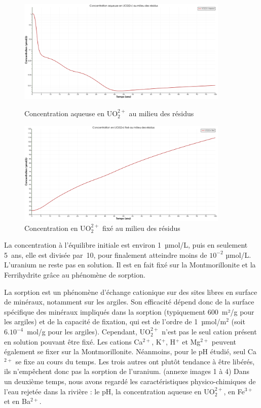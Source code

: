 \documentclass{article}
\begin{document}
\begin{figure}[H]
    \centering
    \begin{minipage}{0.5\textwidth}
        \centering
        \includegraphics[width=0.9\textwidth]{III_B_2_3.png} 
        \caption{Concentration aqueuse en UO$_2^{2+}$ au milieu des résidus}
        \label{fig:UO2_residus_sable_base}
    \end{minipage}\hfill
    \begin{minipage}{0.5\textwidth}
        \centering
        \includegraphics[width=0.9\textwidth]{III_B_2_4.png} 
        \caption{Concentration en UO$_2^{2+}$ fixé au milieu des résidus}
        \label{fig:UO2_fixe_residus_sable_base}
    \end{minipage}
\end{figure}

La concentration à l’équilibre initiale est environ 1~µmol/L, puis en seulement 5~ans, elle est divisée par~10, pour finalement atteindre moins de $10^{-2}$ µmol/L. L’uranium ne reste pas en solution. Il est en fait fixé sur la Montmorillonite et la Ferrihydrite grâce au phénomène de sorption.

La sorption est un phénomène d’échange cationique sur des sites libres en surface de minéraux, notamment sur les argiles. Son efficacité dépend donc de la surface spécifique des minéraux impliqués dans la sorption (typiquement 600~m²/g pour les argiles) et de la capacité de fixation, qui est de l’ordre de 1~µmol/m$^2$ (soit $6 . 10^{-4}$~mol/g pour les argiles). Cependant, UO$_2^{2+}$ n’est pas le seul cation présent en solution pouvant être fixé. Les cations Ca$^{2+}$, K$^{+}$, H$^{+}$ et Mg$^{2+}$ peuvent également se fixer sur la Montmorillonite. Néanmoins, pour le pH étudié, seul Ca$^{2+}$ se fixe au cours du temps. Les trois autres ont plutôt tendance à être libérés, ils n’empêchent donc pas la sorption de l’uranium. (annexe images 1 à 4)
Dans un deuxième temps, nous avons regardé les caractéristiques physico-chimiques de l’eau rejetée dans la rivière : le pH, la concentration aqueuse en UO$_2^{2+}$, en Fe$^{3+}$ et en Ba$^{2+}$.
\end{document}
